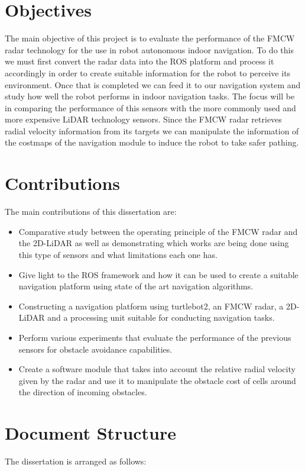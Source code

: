 \section{Objectives}
The main objective of this project is to evaluate the performance of the \ac{FMCW} radar technology for the use in robot autonomous indoor navigation. To do this we must first convert the radar data into the \ac{ROS} platform and process it accordingly in order to create suitable information for the robot to perceive its environment. Once that is completed we can feed it to our navigation system and study how well the robot performs in indoor navigation tasks. The focus will be in comparing the performance of this sensors with the more commonly used and more expensive \ac{LiDAR} technology sensors. Since the \ac{FMCW} \ac{radar} retrieves radial velocity information from its targets we can manipulate the information of the costmaps of the navigation module to induce the robot to take safer pathing.

\section{Contributions}
The main contributions of this dissertation are:
\begin{itemize}
    \item Comparative study between the operating principle of the \ac{FMCW} \ac{radar} and the 2D-\ac{LiDAR} as well as demonstrating which works are being done using this type of sensors and what limitations each one has.
    \item Give light to the \ac{ROS} framework and how it can be used to create a suitable navigation platform using state of the art navigation algorithms.
    \item Constructing a navigation platform using turtlebot2, an \ac{FMCW} \ac{radar}, a 2D- \ac{LiDAR} and a processing unit suitable for conducting navigation tasks.
    \item Perform various experiments that evaluate the performance of the previous sensors for obstacle avoidance capabilities.
    \item Create a software module that takes into account the relative radial velocity given by the \ac{radar} and use it to manipulate the obstacle cost of cells around the direction of incoming obstacles.
\end{itemize}




\section{Document Structure}
The dissertation is arranged as follows:

